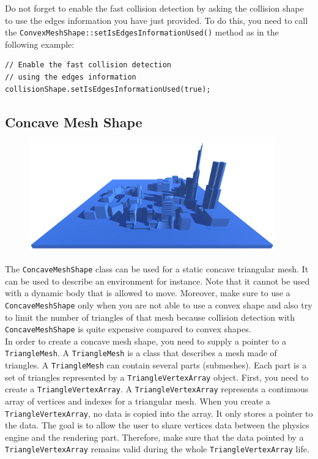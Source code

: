 \documentclass[a4paper,12pt]{article}
\begin{document}
    Do not forget to enable the fast collision detection by asking the collision shape to use the edges information you have just provided. To do this, you need to
    call the \texttt{ConvexMeshShape::setIsEdgesInformationUsed()} method as in the following example: \\

     \begin{lstlisting}
// Enable the fast collision detection
// using the edges information
collisionShape.setIsEdgesInformationUsed(true);
  \end{lstlisting}

  \subsection{Concave Mesh Shape}

  \begin{figure}[h]
      \centering
      \includegraphics{concavemeshshape.png}
      \label{fig:concaveshape}
  \end{figure}

  The \texttt{ConcaveMeshShape} class can be used for a static concave triangular mesh. It can be used to describe an environment for
  instance. Note that it cannot be used with a dynamic body that is allowed to move. Moreover, make sure to use a \texttt{ConcaveMeshShape} only
  when you are not able to use a convex shape and also try to limit the number of triangles of that mesh because collision detection
  with \texttt{ConcaveMeshShape} is quite expensive compared to convex shapes. \\

  In order to create a concave mesh shape, you need to supply a pointer to a \texttt{TriangleMesh}. A \texttt{TriangleMesh} is a class
  that describes a mesh made of triangles. A \texttt{TriangleMesh} can contain several parts (submeshes). Each part is a set of
  triangles represented by a \texttt{TriangleVertexArray} object. First, you need to create a \texttt{TriangleVertexArray}. A \texttt{TriangleVertexArray} represents
  a continuous array of vertices and indexes for a triangular mesh. When you create a \texttt{TriangleVertexArray}, no data is copied
  into the array. It only stores a pointer to the data. The goal is to allow the user to share vertices data between the physics engine and the rendering
  part. Therefore, make sure that the data pointed by a \texttt{TriangleVertexArray} remains valid during the whole \texttt{TriangleVertexArray} life.
  \\
\end{document}
